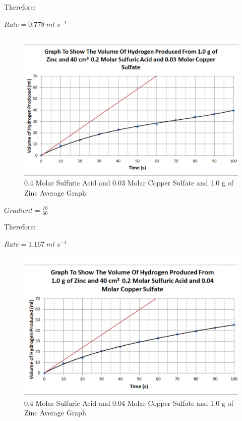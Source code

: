 Therefore:

$Rate = 0.778 \; ml \; s^{-1}$

\begin{figure}[H]
    \includegraphics[width=\textwidth]{./Analysis/Images/3VaryCopperSulfate/003Molar.pdf}
    \caption{0.4 Molar Sulfuric Acid and 0.03 Molar Copper Sulfate and 1.0 g of Zinc Average Graph} \label{fig:003VaryCopperSulfate}
\end{figure}

$Gradient = \frac{70}{60}$

Therefore:

$Rate = 1.167 \; ml \; s^{-1}$

\begin{figure}[H]
    \includegraphics[width=\textwidth]{./Analysis/Images/3VaryCopperSulfate/004Molar.pdf}
    \caption{0.4 Molar Sulfuric Acid and 0.04 Molar Copper Sulfate and 1.0 g of Zinc Average Graph} \label{fig:004VaryCopperSulfate}
\end{figure}

